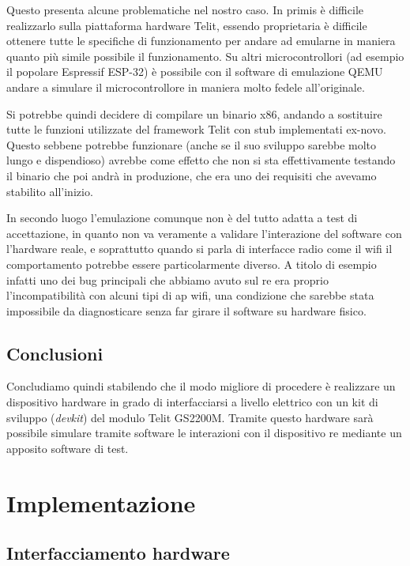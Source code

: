 \documentclass[12pt,a4paper,twoside,titlepage]{book}
\begin{document}
Questo presenta alcune problematiche nel nostro caso. In primis è difficile realizzarlo sulla piattaforma 
hardware Telit, essendo proprietaria è difficile ottenere tutte le specifiche di funzionamento per andare
ad emularne in maniera quanto più simile possibile il funzionamento. Su altri microcontrollori (ad esempio 
il popolare Espressif ESP-32) è possibile con il software di emulazione QEMU andare a simulare il microcontrollore 
in maniera molto fedele all'originale. 

Si potrebbe quindi decidere di compilare un binario x86, andando a sostituire tutte
le funzioni utilizzate del framework Telit con stub implementati ex-novo. Questo
sebbene potrebbe funzionare (anche se il suo sviluppo sarebbe molto lungo e dispendioso)
avrebbe come effetto che non si sta effettivamente testando il binario che poi andrà
in produzione, che era uno dei requisiti che avevamo stabilito all'inizio.

In secondo luogo l'emulazione comunque non è del tutto adatta a test di accettazione, in quanto non va veramente 
a validare l'interazione del software con l'hardware reale, e soprattutto quando si parla di interfacce radio 
come il \Gls{wifi} il comportamento potrebbe essere particolarmente diverso. A titolo di esempio infatti 
uno dei bug principali che abbiamo avuto sul \acrshort{re} era proprio l'incompatibilità con alcuni tipi di \acrlong{ap}
\Gls{wifi}, una condizione che sarebbe stata impossibile da diagnosticare senza far girare il software su hardware fisico.

\section{Conclusioni}

Concludiamo quindi stabilendo che il modo migliore di procedere è realizzare un dispositivo hardware in 
grado di interfacciarsi a livello elettrico con un kit di sviluppo (\textit{devkit}) del modulo Telit GS2200M. 
Tramite questo hardware sarà possibile simulare tramite software le interazioni con il dispositivo \acrshort{re}
mediante un apposito software di test.

\chapter{Implementazione}

\section{Interfacciamento hardware}
\end{document}
